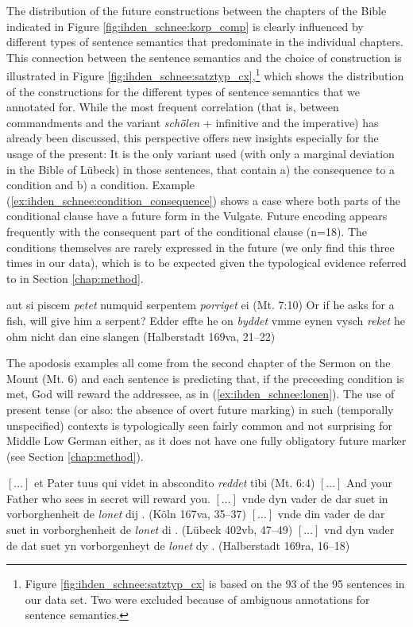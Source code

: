 \documentclass[output=paper,colorlinks,citecolor=brown]{langscibook}
\begin{document}
The distribution of the future constructions between the chapters of the Bible indicated in Figure \ref{fig:ihden_schnee:korp_comp} is clearly influenced by different types of sentence semantics that predominate in the individual chapters. This connection between the sentence semantics and the choice of construction is illustrated in Figure \ref{fig:ihden_schnee:satztyp_cx},\footnote{Figure \ref{fig:ihden_schnee:satztyp_cx} is based on the 93 of the 95 sentences in our data set. Two were excluded because of ambiguous annotations for sentence semantics.} which shows the distribution of the constructions for the different types of sentence semantics that we annotated for. While the most frequent correlation (that is, between commandments and the variant \textit{schȫlen} + infinitive and the imperative) has already been discussed, this perspective offers new insights especially for the usage of the present: It is the only variant used (with only a marginal deviation in the Bible of Lübeck) in those sentences, that contain a) the consequence to a condition and b) a condition. Example (\ref{ex:ihden_schnee:condition_consequence}) shows a case where both parts of the conditional clause have a future form in the Vulgate. Future encoding appears frequently with the consequent part of the conditional clause (n=18). The conditions themselves are rarely expressed in the future (we only find this three times in our data), which is to be expected given the typological evidence referred to in Section \ref{chap:method}.

\ea aut si piscem \textit{petet} numquid serpentem \textit{porriget} ei (Mt. 7:10)\label{ex:ihden_schnee:condition_consequence}
\exi{} Or if he asks for a fish, will give him a serpent?
\ea Edder effte he on \textit{byddet} vmme eynen vysch \textit{reket} he ohm nicht dan eine slangen (Halberstadt 169va, 21--22)
\z
\z

The apodosis examples all come from the second chapter of the Sermon on the Mount (Mt. 6) and each sentence is predicting that, if the preceeding condition is met, God will reward the addressee, as in (\ref{ex:ihden_schnee:lonen}). The use of present tense (or also: the absence of overt future marking) in such (temporally unspecified) contexts is typologically seen fairly common and not surprising for Middle Low German either, as it does not have one fully obligatory future marker (see Section \ref{chap:method}).

\ea $[\ldots]$ et Pater tuus qui videt in abscondito \textit{reddet} tibi (Mt. 6:4)\label{ex:ihden_schnee:lonen}
\exi{} $[\ldots]$ And your Father who sees in secret will reward you.
\ea $[\ldots]$ vnde dyn vader de dar suet in vorborghenheit de \textit{lonet} dij . (Köln 167va, 35--37)\label{ex:ihden_schnee:lonenKLN}
\ex $[\ldots]$ vnde din vader de dar suet in vorborghenheit de \textit{lonet} di . (Lübeck 402vb, 47--49)\label{ex:ihden_schnee:lonenLBK}
\ex $[\ldots]$ vnd dyn vader de dat suet yn vorborgenheyt de \textit{lonet} dy . (Halberstadt 169ra, 16--18)\label{ex:ihden_schnee:lonenHBS}
\z
\z
\end{document}
